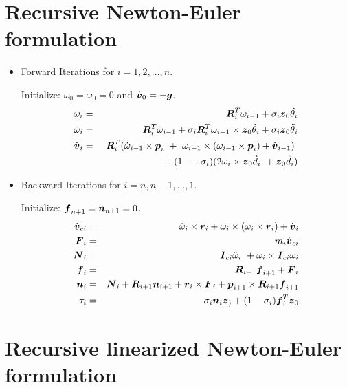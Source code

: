 \section{Recursive Newton-Euler formulation}

\begin{itemize}
\item Forward Iterations for $i=1, 2, \ldots, n$. 

Initialize: $\omega_0 = \dot{\omega}_0 = 0$ and $\dot{\mbox{\boldmath $ v $}}_0 = - \mbox{\boldmath $ g $}$.
\begin{eqnarray}
\omega_i & = & \mbox{\boldmath $ R $}_i^T\omega_{i-1} + \sigma_i \mbox{\boldmath $ z $}_0\dot{\theta_i} \\
\dot{\omega}_i & = & \mbox{\boldmath $ R $}_i^T\dot{\omega}_{i-1} + \sigma_i
 \mbox{\boldmath $ R $}_i^T\omega_{i-1}\times \mbox{\boldmath $ z $}_0 \dot{\theta}_i + \sigma_i\mbox{\boldmath $ z $}_0\ddot{\theta}_i \\
\dot{\mbox{\boldmath $ v $}}_i & = &\ \mbox{\boldmath $ R $}_i^T(\dot{\omega}_{i-1}\times \mbox{\boldmath $ p $}_i\ +\
\omega_{i-1}\times(\omega_{i-1}\times \mbox{\boldmath $ p $}_i) + \dot{\mbox{\boldmath $ v $}}_{i-1})\  \\ \nonumber
            & & + (1\ -\ \sigma_i)(2\omega_i\times \mbox{\boldmath $ z $}_0\dot{d}_i\ + \mbox{\boldmath $ z $}_0\ddot{d}_i)
\end{eqnarray}

\item Backward Iterations for $i=n, n-1, \ldots, 1$. 

Initialize: $\mbox{\boldmath $ f $}_{n+1} = \mbox{\boldmath $ n $}_{n+1} = 0$.
\begin{eqnarray}
\dot{\mbox{\boldmath $ v $}}_{ci} & = & \dot{\omega}_i\times \mbox{\boldmath $ r $}_i + 
\omega_i\times(\omega_i\times \mbox{\boldmath $ r $}_i) + \dot{\mbox{\boldmath $ v $}}_i \\
\mbox{\boldmath $ F $}_i & = & m_i \dot{\mbox{\boldmath $ v $}}_{ci} \\
\mbox{\boldmath $ N $}_i & = & \mbox{\boldmath $ I $}_{ci}\ddot{\omega}_i\ + \omega_i \times \mbox{\boldmath $ I $}_{ci}\omega_i \\
\mbox{\boldmath $ f $}_i & = & \mbox{\boldmath $ R $}_{i+1}\mbox{\boldmath $ f $}_{i+1} + \mbox{\boldmath $ F $}_i \\
\mbox{\boldmath $ n $}_i & = & \mbox{\boldmath $ N $}_i + \mbox{\boldmath $ R $}_{i+1} \mbox{\boldmath $ n $}_{i+1} +
\mbox{\boldmath $ r $}_i \times \mbox{\boldmath $ F $}_i + \mbox{\boldmath $ p $}_{i+1}\times \mbox{\boldmath $ R $}_{i+1}\mbox{\boldmath $ f $}_{i+1} \\
\tau_i & = & \sigma_i \mbox{\boldmath $ n $}_i \mbox{\boldmath $ z $}_) + (1 - \sigma_i)
\mbox{\boldmath $ f $}_i^T \mbox{\boldmath $ z $}_0
\end{eqnarray}
\end{itemize}


\section{Recursive linearized Newton-Euler formulation}


